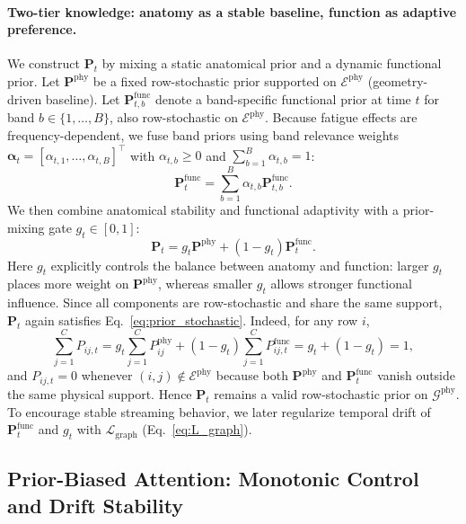 \documentclass[preprint,12pt]{elsarticle}
\begin{document}
\paragraph{Two-tier knowledge: anatomy as a stable baseline, function as adaptive preference.}
We construct $\mathbf{P}_t$ by mixing a static anatomical prior and a dynamic functional prior.
Let $\mathbf{P}^{\mathrm{phy}}$ be a fixed row-stochastic prior supported on $\mathcal{E}^{\mathrm{phy}}$ (geometry-driven baseline).
Let $\mathbf{P}^{\mathrm{func}}_{t,b}$ denote a band-specific functional prior at time $t$ for band $b\in\{1,\ldots,B\}$,
also row-stochastic on $\mathcal{E}^{\mathrm{phy}}$.
Because fatigue effects are frequency-dependent, we fuse band priors using band relevance weights
$\boldsymbol{\alpha}_t=[\alpha_{t,1},\ldots,\alpha_{t,B}]^\top$ with $\alpha_{t,b}\ge 0$ and $\sum_{b=1}^{B}\alpha_{t,b}=1$:
\begin{equation}
\mathbf{P}^{\mathrm{func}}_t
=
\sum_{b=1}^{B}\alpha_{t,b}\mathbf{P}^{\mathrm{func}}_{t,b}.
\label{eq:spectral_fusion}
\end{equation}
We then combine anatomical stability and functional adaptivity with a prior-mixing gate $g_t\in[0,1]$:
\begin{equation}
\mathbf{P}_t
=
g_t\mathbf{P}^{\mathrm{phy}} + (1-g_t)\mathbf{P}^{\mathrm{func}}_t.
\label{eq:gate_fusion}
\end{equation}
Here $g_t$ explicitly controls the balance between anatomy and function:
larger $g_t$ places more weight on $\mathbf{P}^{\mathrm{phy}}$,
whereas smaller $g_t$ allows stronger functional influence.
Since all components are row-stochastic and share the same support, $\mathbf{P}_t$ again satisfies Eq.~\eqref{eq:prior_stochastic}.
Indeed, for any row $i$,
\[
\sum_{j=1}^{C}P_{ij,t}
=
g_t\sum_{j=1}^{C}P^{\mathrm{phy}}_{ij}
+
(1-g_t)\sum_{j=1}^{C}P^{\mathrm{func}}_{ij,t}
=
g_t+(1-g_t)
=
1,
\]
and $P_{ij,t}=0$ whenever $(i,j)\notin\mathcal{E}^{\mathrm{phy}}$ because both
$\mathbf{P}^{\mathrm{phy}}$ and $\mathbf{P}^{\mathrm{func}}_t$ vanish outside the same physical support.
Hence $\mathbf{P}_t$ remains a valid row-stochastic prior on $\mathcal{G}^{\mathrm{phy}}$.
To encourage stable streaming behavior, we later regularize temporal drift of $\mathbf{P}^{\mathrm{func}}_t$ and $g_t$
with $\mathcal{L}_{\mathrm{graph}}$ (Eq.~\eqref{eq:L_graph}).

\subsection{Prior-Biased Attention: Monotonic Control and Drift Stability}
\label{sec:theory_attention}
\end{document}
